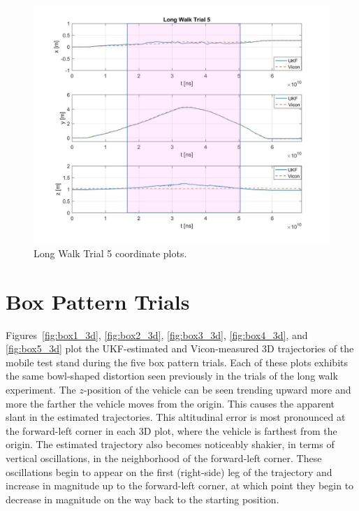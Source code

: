 \begin{figure}[p]
  \centering
    \includegraphics[width=\textwidth]{longWalk5_xyz}
  \caption[Long Walk Trial 5]{Long Walk Trial 5 coordinate plots.}
  \label{fig:longWalk5_xyz}
\end{figure}
\clearpage

\section{Box Pattern Trials}

Figures~\ref{fig:box1_3d}, \ref{fig:box2_3d}, \ref{fig:box3_3d}, \ref{fig:box4_3d}, and \ref{fig:box5_3d} plot the UKF-estimated and Vicon-measured 3D trajectories of the mobile test stand during the five box pattern trials. Each of these plots exhibits the same bowl-shaped distortion seen previously in the trials of the long walk experiment. The $z$-position of the vehicle can be seen trending upward more and more the farther the vehicle moves from the origin. This causes the apparent slant in the estimated trajectories. This altitudinal error is most pronounced at the forward-left corner in each 3D plot, where the vehicle is farthest from the origin. The estimated trajectory also becomes noticeably shakier, in terms of vertical oscillations, in the neighborhood of the forward-left corner. These oscillations begin to appear on the first (right-side) leg of the trajectory and increase in magnitude up to the forward-left corner, at which point they begin to decrease in magnitude on the way back to the starting position.

